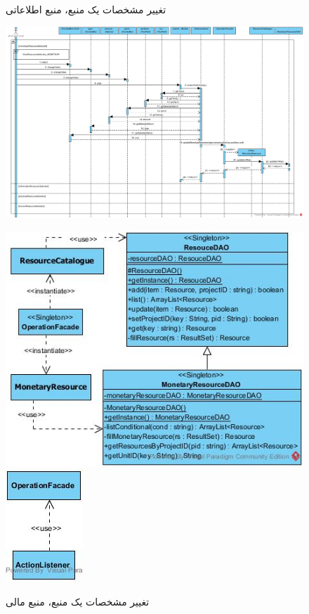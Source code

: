 \begin{landscape}
\begin{figure}[H]
	\caption{تغییر مشخصات یک منبع، منبع اطلاعاتی}
\end{figure}
\begin{figure}[H]
	\centering
	\includegraphics[scale=0.6]{img/sequence-design/EditResourceAttributes_MONETARY}
\end{figure}
\begin{figure}[H]
	\centering
	\includegraphics[scale=0.6]{img/sequence-design/EditResourceAttributes_MONETARYC}
	\includegraphics[scale=0.6]{img/sequence-design/EditResourceAttributes_MONETARYUI}
	\caption{تغییر مشخصات یک منبع، منبع مالی}
\end{figure}


\end{landscape}
